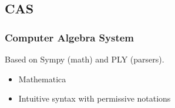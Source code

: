 \subsection{CAS}
\begin{frame}[fragile]
    \frametitle{Computer Algebra System}
    Based on \alert{Sympy} (math) and \alert{PLY} (parsers).
    
    \vfill    
    
    \begin{itemize}
        \item<3-> Mathematica
        \item<4-> Intuitive syntax with permissive notations 
    \end{itemize}
\end{frame}
